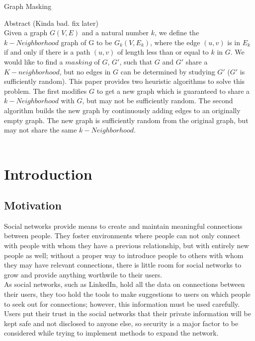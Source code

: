 \documentclass[11pt]{article}
\begin{document}
\begin{center}
Graph Masking
\end{center}
\vspace{.1in}

Abstract (Kinda bad. fix later)\\
\noindent Given a graph $G(V,E)$ and a natural number $k$, we define the $k-Neighborhood$  graph of G to be $G_k(V, E_k)$, where the edge $(u,v)$ is in $E_k$ if and only if there is a path $(u,v)$ of length less than or equal to $k$ in $G$. We would like to find a $masking$ of $G$, $G'$, such that $G$ and $G'$ share a $K-neighborhood$, but no edges in $G$ can be determined by studying $G'$ ($G'$ is sufficiently random). This paper provides two heuristic algorithms to solve this problem. The first modifies $G$ to get a new graph which is guaranteed to share a $k-Neighborhood$ with $G$, but may not be sufficiently random. The second algorithm builds the new graph by continuously adding edges to an originally empty graph. The new graph is sufficiently random from the original graph, but may not share the same $k-Neighborhood$.
\\\\


\section{Introduction}

\subsection{Motivation}

\noindent Social networks provide means to create and maintain meaningful connections between people. They foster environments where people can not only connect with people with whom they have a previous relationship, but with entirely new people as well; without a proper way to introduce people to others with whom they may have relevant connections, there is little room for social networks to grow and provide anything worthwile to their users. \\

\noindent As social networks, such as LinkedIn, hold all the data on connections between their users, they too hold the tools to make suggestions to users on which people to seek out for connections; however, this information must be used carefully. Users put their trust in the social networks that their private information will be kept safe and not disclosed to anyone else, so security is a major factor to be considered while trying to implement methods to expand the network.  \\
\end{document}
